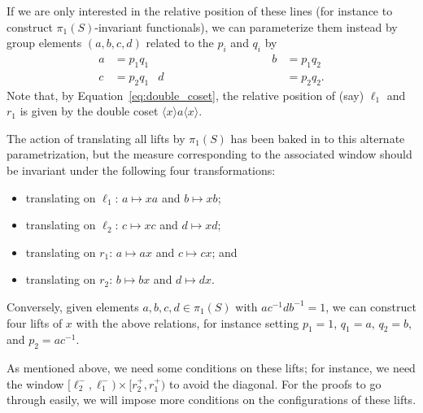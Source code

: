   If we are only interested in the relative position of these lines
  (for instance to construct $\pi_1(S)$-invariant functionals), we
  can parameterize them instead by group elements $(a,b,c,d)$ related
  to the $p_i$ and $q_i$ by
\begin{equation}
\begin{aligned}
  a &= p_1 q_1 &\qquad\qquad\qquad\qquad\qquad b &= p_1 q_2\\[2pt]
  c &= p_2 q_1 & d &= p_2 q_2.
\end{aligned}
  \label{eq:relationdatum}
\end{equation}
Note that, by Equation~\eqref{eq:double_coset}, the relative position
of (say) $\ell_1$ and $r_1$ is given by the double coset
$\langle x \rangle a \langle x \rangle$.

The action of translating all lifts by $\pi_1(S)$ has been baked in to
this alternate parametrization,
but the measure corresponding to the associated window should be
invariant under the following four transformations:
\begin{itemize}
\item translating on $\ell_1$: $a \mapsto xa$ and $b \mapsto xb$;
\item translating on $\ell_2$: $c \mapsto xc$ and $d \mapsto xd$;
\item translating on $r_1$: $a \mapsto ax$ and $c \mapsto cx$; and
\item translating on $r_2$: $b \mapsto bx$ and $d \mapsto dx$.
\end{itemize}

Conversely, given elements $a,b,c,d \in \pi_1(S)$ with
$ac^{-1}db^{-1} = 1$, we can
construct four lifts of $x$ with the above relations, for instance
setting $p_1 = 1$, $q_1 = a$, $q_2 = b$, and $p_2 = ac^{-1}$.

As mentioned above, we need some conditions on these lifts; for
instance, we need the window
$[\ell_2^-,\ell_1^-) \times [r_2^+,r_1^+)$ to avoid the
diagonal. For the proofs to go through easily, we will impose more
conditions on the configurations of these lifts.

